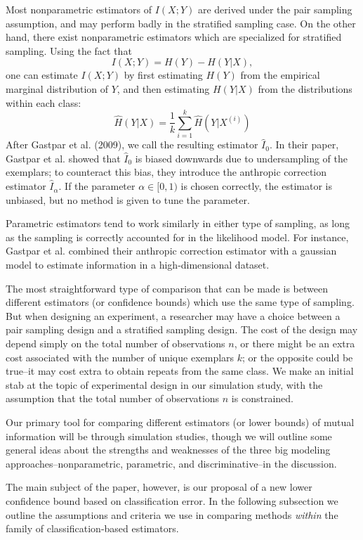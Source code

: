 \documentclass{article}
\begin{document}
Most nonparametric estimators of $I(X; Y)$ are derived under the pair sampling assumption, and may perform badly in the stratified sampling case.  On the other hand, there exist nonparametric estimators which are specialized for stratified sampling.  Using the fact that
\[
I(X; Y) = H(Y) - H(Y|X),
\]
one can estimate $I(X; Y)$ by first estimating $H(Y)$ from the empirical marginal distribution of $Y$, and then estimating $H(Y|X)$ from the distributions within each class:
\[
\hat{H}(Y|X)  = \frac{1}{k} \sum_{i=1}^k \hat{H}(Y|X^{(i)})
\]
After Gastpar et al. (2009), we call the resulting estimator $\hat{I}_0$.
In their paper, Gastpar et al. showed that $\hat{I}_0$ is biased downwards due to undersampling of the exemplars;
to counteract this bias, they introduce the anthropic correction estimator $\hat{I}_\alpha$.
If the parameter $\alpha \in [0, 1)$ is chosen correctly, the estimator is unbiased, but no method is given to tune the parameter.

Parametric estimators tend to work similarly in either type of sampling,
as long as the sampling is correctly accounted for in the likelihood model.
For instance, Gastpar et al. combined their anthropic correction estimator with a gaussian model
to estimate information in a high-dimensional dataset.

The most straightforward type of comparison that can be made is between different estimators (or confidence bounds)  which use the same type of sampling.  But when designing an experiment, a researcher
may have a choice between a pair sampling design and a stratified sampling design.  The cost of the design
may depend simply on the total number of observations $n$, or there might be an extra cost associated with
the number of unique exemplars $k$; or the opposite could be true--it may cost extra to obtain repeats from the same class.  We make an initial stab at the topic of experimental design in our simulation study,
with the assumption that the total number of observations $n$ is constrained.

Our primary tool for comparing different estimators (or lower bounds) of mutual information will be through simulation studies, though we will outline some general ideas about the strengths and weaknesses of the three big modeling approaches--nonparametric, parametric, and discriminative--in the discussion.

The main subject of the paper, however, is our proposal of a new lower confidence bound based on classification error.  In the following subsection we outline the assumptions and criteria we use
in comparing methods \emph{within} the family of classification-based estimators.
\end{document}
